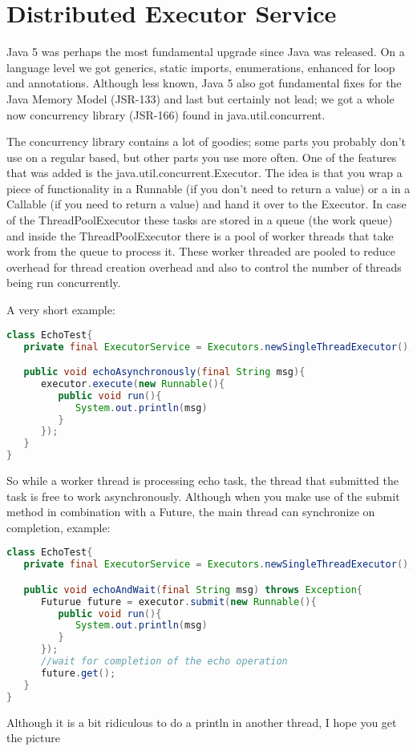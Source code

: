\chapter{Distributed Executor Service}

Java 5 was perhaps the most fundamental upgrade since Java was released. On a language level we got generics, static imports, enumerations, enhanced for loop and annotations. Although less known, Java 5 also got fundamental fixes for the Java Memory Model (JSR-133) and last but certainly not lead; we got a whole now concurrency library (JSR-166) found in java.util.concurrent.

The concurrency library contains a lot of goodies; some parts you probably don't use on a regular based, but other parts you use more often. One of the features that was added is the java.util.concurrent.Executor. The idea is that you wrap a piece of functionality in a Runnable (if you don't need to return a value) or a in a Callable (if you need to return a value) and hand it over to the Executor. In case of the ThreadPoolExecutor these tasks are stored in a queue (the work queue) and inside the ThreadPoolExecutor there is a pool of worker threads that take work from the queue to process it. These worker threaded are pooled to reduce overhead for thread creation overhead and also to control the number of threads being run concurrently.

A very short example:
\begin{lstlisting}[language=java]
class EchoTest{
   private final ExecutorService = Executors.newSingleThreadExecutor();

   public void echoAsynchronously(final String msg){
      executor.execute(new Runnable(){
         public void run(){
            System.out.println(msg)
         }
      });	
   }
}
\end{lstlisting}

So while a worker thread is processing echo task, the thread that submitted the task is free to work asynchronously. Although when you make use of the submit method in combination with a Future, the main thread can synchronize on completion, example:
\begin{lstlisting}[language=java]
class EchoTest{
   private final ExecutorService = Executors.newSingleThreadExecutor();

   public void echoAndWait(final String msg) throws Exception{
      Futurue future = executor.submit(new Runnable(){
         public void run(){
            System.out.println(msg)
         }
      });	
      //wait for completion of the echo operation
	  future.get();
   }
}
\end{lstlisting}
Although it is a bit ridiculous to do a println in another thread, I hope you get the picture 

